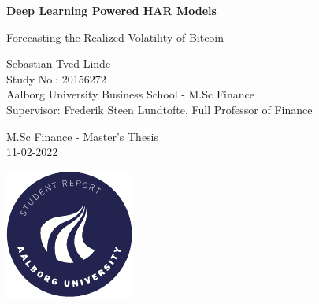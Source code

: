 \documentclass[12pt, a4paper, openright]{report}
\author{Sebastian Tved Linde}
\date{\today}
\title{}
\begin{document}
\begin{titlepage}
\vspace*{\fill}
  \noindent%
    \begin{center}
    \Huge{\textbf{
          Deep Learning Powered HAR Models
          }}
    \end{center}
    \begin{center}
      \Large{
      Forecasting the Realized Volatility of Bitcoin
      }
    \end{center}
    \vspace{0.2cm}
   \begin{center}
    {\Large
      Sebastian Tved Linde
    }\\
    \vspace{0.2cm}
    {\large
    Study No.: 20156272
    }\\
    \vspace{0.2cm}
    {\large
      Aalborg University Business School - M.Sc Finance
    }\\
   \vspace{0.2cm}
   {\large
   Supervisor: Frederik Steen Lundtofte, Full Professor of Finance 
   }

   \end{center}

   \vspace{0.2cm}
   \begin{center}
    {\Large
     M.Sc Finance - Master's Thesis
    }\\
   \vspace{0.2cm}
   {\Large
   11-02-2022
   }
   \end{center}
  \vfill
  \begin{center}
    \includegraphics[width=0.2\paperwidth]{aauGraphics/aau_logo_circle_en}%
  \end{center}
\end{titlepage}
\clearpage
\end{document}

